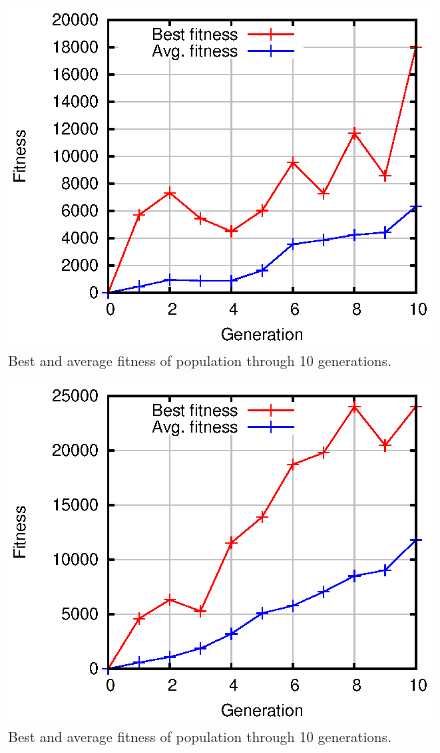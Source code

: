\documentclass[conference]{IEEEtran}
\begin{document}
\begin{figure}[!htb]
\centering
\includegraphics[scale=.7]{gashortb.eps}
\caption{Best and average fitness of population through 10 generations.}
\label{fig:EASHORTB}
\end{figure}

\begin{figure}[!htb]
\centering
\includegraphics[scale=.7]{gashortc.eps}
\caption{Best and average fitness of population through 10 generations.}
\label{fig:EASHORTC}
\end{figure}
\end{document}
